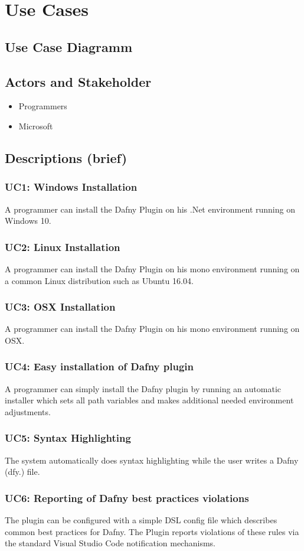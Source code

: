 \section{Use Cases}
\subsection{Use Case Diagramm}
\subsection{Actors and Stakeholder}
\begin{itemize}
	\item Programmers
	\item Microsoft
\end{itemize}
\subsection{Descriptions (brief)}
\subsubsection{UC1: Windows Installation}
A programmer can install the Dafny Plugin on his .Net environment running on Windows 10.
\subsubsection{UC2: Linux Installation}
A programmer can install the Dafny Plugin on his mono environment running on a common Linux distribution such as Ubuntu 16.04.
\subsubsection{UC3: OSX Installation}
A programmer can install the Dafny Plugin on his mono environment running on OSX.
\subsubsection{UC4: Easy installation of Dafny plugin}
A programmer can simply install the Dafny plugin by running an automatic installer which sets all path variables and makes additional needed environment adjustments.
\subsubsection{UC5: Syntax Highlighting}
The system automatically does syntax highlighting while the user writes a Dafny (dfy.) file.
\subsubsection{UC6: Reporting of Dafny best practices violations}
The plugin can be configured with a simple DSL config file which describes common best practices for Dafny. The Plugin reports violations of these rules via the standard Visual Studio Code notification mechanisms.
